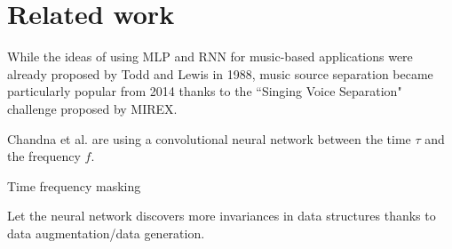 \section{Related work}
\label{sec:related}

While the ideas of using MLP and RNN for music-based applications were already proposed  by Todd \cite{Todd1988} and Lewis \cite{Lewis1988} in 1988,  music source separation became particularly popular from 2014 thanks to the ``Singing Voice Separation" challenge proposed by MIREX.



Chandna et al. \cite{chandna2017monoaural} are using a convolutional neural network between the time $\tau$ and the frequency $f$.

Time frequency masking



Let the neural network discovers more invariances in data structures thanks to data augmentation/data generation.